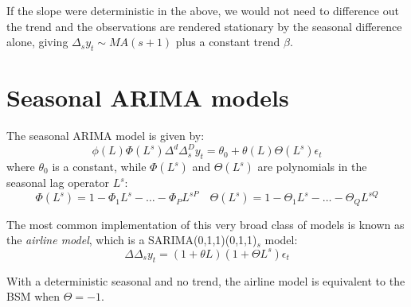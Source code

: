 \documentclass[DIV=14,titlepage=false]{scrreprt}
\begin{document}
\begin{note}
    If the slope were deterministic in the above, we would not need to difference out the trend and the observations are rendered stationary by the seasonal difference alone, giving $\Delta_s y_t \sim MA(s+1)$ plus a constant trend $\beta$.
\end{note}
\section{Seasonal ARIMA models}
\begin{definition}[SARIMA(p,d,q)(P,D,Q)$_s$]
    The seasonal ARIMA model is given by:
    \[
        \phi(L)\Phi(L^s)\Delta^d \Delta_s^D y_t = \theta_0 + \theta(L)\Theta(L^s)\epsilon_t
    \]
    where $\theta_0$ is a constant, while $\Phi(L^s)$ and $\Theta(L^s)$ are polynomials in the seasonal lag operator $L^s$:
    \[
        \Phi(L^s) = 1 - \Phi_1 L^s - \ldots - \Phi_P L^{sP} \quad \Theta(L^s) = 1 - \Theta_1 L^s - \ldots - \Theta_Q L^{sQ}
    \]
\end{definition}
The most common implementation of this very broad class of models is known as the \textit{airline model}, which is a SARIMA(0,1,1)(0,1,1)$_s$ model:
\[
    \Delta \Delta_s y_t = (1+\theta L)(1+\Theta L^s)\epsilon_t
\]
\begin{claim}
    With a deterministic seasonal and no trend, the airline model is equivalent to the BSM when $\Theta = -1$.
\end{claim}
\end{document}
